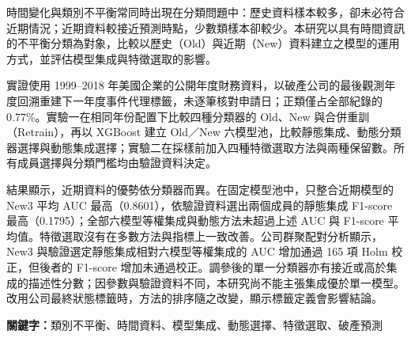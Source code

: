 時間變化與類別不平衡常同時出現在分類問題中：歷史資料樣本較多，卻未必符合近期情況；近期資料較接近預測時點，少數類樣本卻較少。本研究以具有時間資訊的不平衡分類為對象，比較以歷史（Old）與近期（New）資料建立之模型的運用方式，並評估模型集成與特徵選取的影響。

實證使用 1999--2018 年美國企業的公開年度財務資料，以破產公司的最後觀測年度回溯重建下一年度事件代理標籤，未逐筆核對申請日；正類僅占全部紀錄的 0.77\%。實驗一在相同年份配置下比較四種分類器的 Old、New 與合併重訓（Retrain），再以 XGBoost 建立 Old／New 六模型池，比較靜態集成、動態分類器選擇與動態集成選擇；實驗二在採樣前加入四種特徵選取方法與兩種保留數。所有成員選擇與分類門檻均由驗證資料決定。

結果顯示，近期資料的優勢依分類器而異。在固定模型池中，只整合近期模型的 New3 平均 AUC 最高（0.8601），依驗證資料選出兩個成員的靜態集成 F1-score 最高（0.1795）；全部六模型等權集成與動態方法未超過上述 AUC 與 F1-score 平均值。特徵選取沒有在多數方法與指標上一致改善。公司群聚配對分析顯示，New3 與驗證選定靜態集成相對六模型等權集成的 AUC 增加通過 165 項 Holm 校正，但後者的 F1-score 增加未通過校正。調參後的單一分類器亦有接近或高於集成的描述性分數；因參數與驗證資料不同，本研究尚不能主張集成優於單一模型。改用公司最終狀態標籤時，方法的排序隨之改變，顯示標籤定義會影響結論。

\noindent\textbf{關鍵字：}類別不平衡、時間資料、模型集成、動態選擇、特徵選取、破產預測
